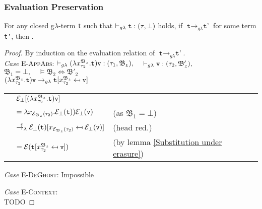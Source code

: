 \subsubsection{Evaluation Preservation}
\theoremstyle{remark}
\begin{theorem}
	For any closed g$\lambda$-term \texttt{t} such that
	$\vdash_{g\lambda} \texttt{t} : (\tau, \bot)$ holds, 
	if	$\texttt{t} \rightarrow_{g\lambda} \texttt{t'}$ for some term \texttt{t'}, then
	 . 
\end{theorem}
\begin{proof} By induction on the evaluation relation of $\texttt{t} \rightarrow_{g\lambda} \texttt{t'}$. \\

\noindent\textit{Case} \textsc{E-AppAbs}: \qquad 
 $\vdash_{g\lambda} (\lambda x^{\mathfrak{B_{2}}}_{\tau_{2}}.\texttt{t})\texttt{v} : (\tau_{1}, \mathfrak{B_{1}}), \quad$
$\vdash_{g\lambda} \texttt{v} : (\tau_{2}, \mathfrak{B'_{2}}), $ \\
$ \mathfrak{B_{1}} = \bot,  \quad 
\vDash\mathfrak{B_{2}} \Leftrightarrow \mathfrak{B'_{2}} $ \\
$(\lambda x^{\mathfrak{B_{2}}}_{\tau_{2}}.\texttt{t})\texttt{v} 
\rightarrow_{g\lambda} \texttt{t} [x^{\mathfrak{B_{2}}}_{\tau_{2}} \mapsfrom \texttt{v}]$ \\
\begin{center}
\begin{tabular}{lll}
   & $\mathcal{E}_{\bot}[(\lambda x^{\mathfrak{B_{2}}}_{\tau_{2}}.\texttt{t})\texttt{v}]$ &\\
   & $ = \lambda x_{\mathcal{E}_{\mathfrak{B_{2}}}(\tau_{2})}. \mathcal{E}_{\bot}(\texttt{t}))\mathcal{E}_{\bot}(\texttt{v})$ 
   & (as $ \mathfrak{B_{1}} = \bot $)  \\
   &  $ \stackrel{\epsilon}{\rightarrow_{\lambda}} 
   \mathcal{E}_{\bot}(\texttt{t}) [x_{\mathcal{E}_{\mathfrak{B_{2}}}(\tau_{2})} \mapsfrom \mathcal{E}_{\bot}(\texttt{v})]$ & (head red.) \\
   & $ = \mathcal{E}(\texttt{t} [x^{\mathfrak{B_{2}}}_{\tau_{2}} \mapsfrom \texttt{v}]) $ 
   & (by lemma \ref{Substitution under erasure})

 \end{tabular}
  \end{center}

\noindent\textit{Case} \textsc{E-DeGhost}: Impossible \qquad 

\noindent\textit{Case} \textsc{E-Context}: \qquad \\
\hspace*{5cm}TODO
 

\end{proof}

